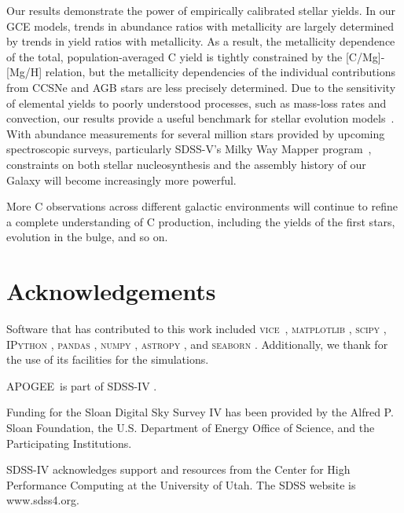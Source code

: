 \documentclass[fleqn,
usenatbib]{mnras}
\newcommand{\VICE}{\textsc{vice}}
\newcommand{\apogee}{APOGEE}
\begin{document}
Our results demonstrate the power of empirically calibrated stellar yields. In our GCE models, trends in abundance ratios with metallicity are largely determined by trends in yield ratios with metallicity. As a result, the metallicity dependence of the total, population-averaged C yield is tightly constrained by the [C/Mg]-[Mg/H] relation, but the metallicity dependencies of the individual contributions from CCSNe and AGB stars are less precisely determined. Due to the sensitivity of elemental yields to poorly understood processes, such as mass-loss rates and convection, our results provide a useful benchmark for stellar evolution models~\citep[see the discussion in e.g.][]{gil-pons+2022}. With abundance measurements for several million stars provided by upcoming spectroscopic surveys, particularly SDSS-V's Milky Way Mapper program~\citep{sdssv}, constraints on both stellar nucleosynthesis and the assembly history of our Galaxy will become increasingly more powerful.

More C observations across different galactic environments will continue to refine a complete understanding of C production, including the yields of the first stars,  evolution in the bulge, and so on. 



\section*{Acknowledgements}

Software that has contributed to this work included  
\VICE~\citep{JW20, james+21},
\textsc{matplotlib} \citep{matplotlib},
\textsc{scipy} \citep{scipy},
\textsc{IPython} \citep{ipy},
\textsc{pandas} \citep{pandas},
\textsc{numpy} \citep{numpy},
\textsc{astropy} \citep{astropy:2013, astropy:2018, astropy:2022},
and 
\textsc{seaborn} \citep{seaborn}
.
Additionally, we thank \citet{OhioSupercomputerCenter1987} for the use of its facilities for the simulations. 

\apogee\ is part of SDSS-IV \citep{sloan_telescope, apogee_instrumentation, sdss_iv_overview, sdss17, apogee17, aspcap}.

Funding for the Sloan Digital Sky 
Survey IV has been provided by the 
Alfred P. Sloan Foundation, the U.S. 
Department of Energy Office of 
Science, and the Participating 
Institutions. 

SDSS-IV acknowledges support and 
resources from the Center for High 
Performance Computing  at the 
University of Utah. The SDSS 
website is www.sdss4.org.
\end{document}
